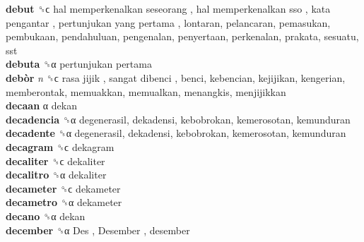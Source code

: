 \textbf{debut} ␝ϲ   hal memperkenalkan seseorang ,  hal memperkenalkan sso ,  kata pengantar ,  pertunjukan yang pertama , lontaran, pelancaran, pemasukan, pembukaan, pendahuluan, pengenalan, penyertaan, perkenalan, prakata, sesuatu, sst  \\
\textbf{debuta} ␝α   pertunjukan pertama   \\
\textbf{debòr} \emph{n}  ␝ϲ   rasa jijik ,  sangat dibenci , benci, kebencian, kejijikan, kengerian, memberontak, memuakkan, memualkan, menangkis, menjijikkan  \\
\textbf{decaan} α  dekan  \\
\textbf{decadencia} ␝α  degenerasil, dekadensi, kebobrokan, kemerosotan, kemunduran  \\
\textbf{decadente} ␝α  degenerasil, dekadensi, kebobrokan, kemerosotan, kemunduran  \\
\textbf{decagram} ␝ϲ  dekagram  \\
\textbf{decaliter} ␝ϲ  dekaliter  \\
\textbf{decalitro} ␝α  dekaliter  \\
\textbf{decameter} ␝ϲ  dekameter  \\
\textbf{decametro} ␝α  dekameter  \\
\textbf{decano} ␝α  dekan  \\
\textbf{december} ␝α   Des ,  Desember , desember  \\
